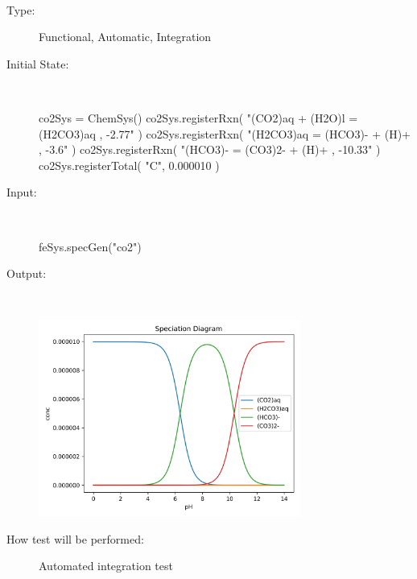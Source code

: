 \documentclass[12pt, titlepage]{article}
\newcounter{testnum} %
\begin{document}
\\
\begin{addmargin}[2em]{0em}
\begin{description}
\item[Type:] Functional, Automatic, Integration
					
\item[Initial State:] ~\newline

\begin{python}
co2Sys = ChemSys()
co2Sys.registerRxn(
  "(CO2)aq + (H2O)l = (H2CO3)aq , -2.77"
)
co2Sys.registerRxn(
  "(H2CO3)aq = (HCO3)- + (H)+ , -3.6"
)
co2Sys.registerRxn(
  "(HCO3)- = (CO3)2- + (H)+ , -10.33"
)
co2Sys.registerTotal(
  "C", 0.000010
)
\end{python}
					
\item[Input:] ~\newline

\begin{python}
feSys.specGen("co2")
\end{python}

					
\item[Output:] ~\newline

\includegraphics[width=0.7\textwidth]{co2_syst}
					
\item[How test will be performed:] Automated integration test\\
\end{description}
\end{addmargin}
\end{document}
